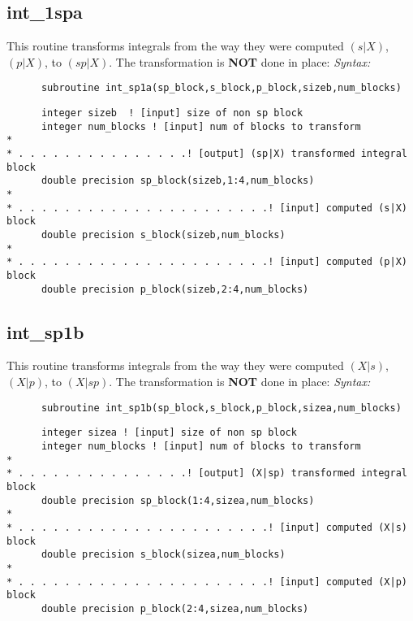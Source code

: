 \subsection{int\_1spa} 
This routine transforms integrals from the way they 
were computed $(s|X)$, $(p|X)$, to $(sp|X)$. 
The transformation is {\bf NOT} done in place: 
{\it Syntax:} 
\begin{verbatim} 
      subroutine int_sp1a(sp_block,s_block,p_block,sizeb,num_blocks) 
\end{verbatim} 
\begin{verbatim} 
      integer sizeb  ! [input] size of non sp block 
      integer num_blocks ! [input] num of blocks to transform 
* 
* . . . . . . . . . . . . . . .! [output] (sp|X) transformed integral block 
      double precision sp_block(sizeb,1:4,num_blocks)  
* 
* . . . . . . . . . . . . . . . . . . . . . .! [input] computed (s|X) block 
      double precision s_block(sizeb,num_blocks) 
* 
* . . . . . . . . . . . . . . . . . . . . . .! [input] computed (p|X) block 
      double precision p_block(sizeb,2:4,num_blocks) 
\end{verbatim} 
\subsection{int\_sp1b} 
This routine transforms integrals from the way they 
were computed $(X|s)$, $(X|p)$, to $(X|sp)$. 
The transformation is {\bf NOT} done in place: 
{\it Syntax:} 
\begin{verbatim} 
      subroutine int_sp1b(sp_block,s_block,p_block,sizea,num_blocks) 
\end{verbatim} 
\begin{verbatim} 
      integer sizea ! [input] size of non sp block 
      integer num_blocks ! [input] num of blocks to transform 
* 
* . . . . . . . . . . . . . . .! [output] (X|sp) transformed integral block 
      double precision sp_block(1:4,sizea,num_blocks) 
* 
* . . . . . . . . . . . . . . . . . . . . . .! [input] computed (X|s) block 
      double precision s_block(sizea,num_blocks) 
* 
* . . . . . . . . . . . . . . . . . . . . . .! [input] computed (X|p) block 
      double precision p_block(2:4,sizea,num_blocks) 
\end{verbatim} 
